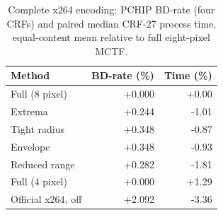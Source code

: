\begin{table}[t]\centering
\caption{Complete x264 encoding: PCHIP BD-rate (four CRFs) and paired median CRF-27 process time, equal-content mean relative to full eight-pixel MCTF.}\label{tab:encoder}
\setlength{\tabcolsep}{4pt}
\begin{tabular}{lrr}\toprule
Method & BD-rate (\%) & Time (\%)\\\midrule
Full (8 pixel) & +0.000 & +0.00\\
Extrema & +0.244 & -1.01\\
Tight radius & +0.348 & -0.87\\
Envelope & +0.348 & -0.93\\
Reduced range & +0.282 & -1.81\\
Full (4 pixel) & +0.000 & +1.29\\
Official x264, off & +2.092 & -3.36\\
\bottomrule\end{tabular}
\end{table}
